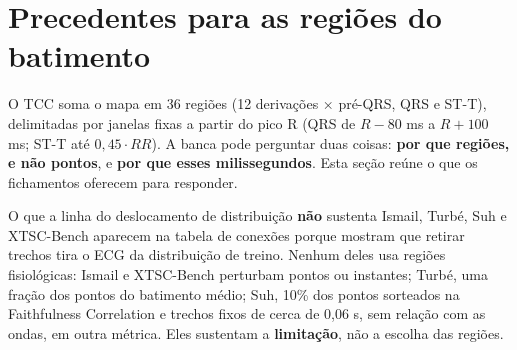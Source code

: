 \documentclass[11pt,a4paper]{article}
\begin{document}
\section{Precedentes para as regiões do batimento}\label{sec:regioes}
O TCC soma o mapa em 36 regiões (12 derivações × pré-QRS, QRS e ST-T), delimitadas por janelas fixas a partir do pico R (QRS de $R - 80$ ms a $R + 100$ ms; ST-T até $0{,}45 \cdot RR$). A banca pode perguntar duas coisas: \textbf{por que regiões, e não pontos}, e \textbf{por que esses milissegundos}. Esta seção reúne o que os fichamentos oferecem para responder.

\begin{infobox}[warn]{O que a linha do deslocamento de distribuição \textbf{não} sustenta}
Ismail, Turbé, Suh e XTSC-Bench aparecem na tabela de conexões porque mostram que retirar trechos tira o ECG da distribuição de treino. Nenhum deles usa regiões fisiológicas: Ismail e XTSC-Bench perturbam pontos ou instantes; Turbé, uma fração dos pontos do batimento médio; Suh, 10\% dos pontos sorteados na Faithfulness Correlation e trechos fixos de cerca de 0,06 s, sem relação com as ondas, em outra métrica. Eles sustentam a \textbf{limitação}, não a escolha das regiões.
\end{infobox}
\end{document}
